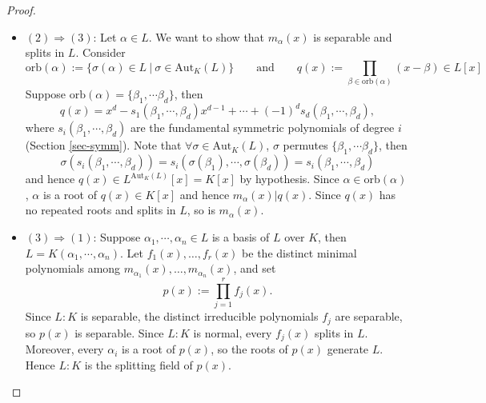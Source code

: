 \begin{proof}
\begin{itemize}
        \item $(2)\Rightarrow (3)$: Let $\alpha \in L $. We want to show that $m_{\alpha}(x) $ is separable and splits in $L$. Consider 
        $$\mathrm{orb}(\alpha):=\{\sigma(\alpha) \in L\ |\ \sigma \in \mathrm{Aut}_K(L)\}  \quad \quad \mathrm{  and  } \quad \quad q(x):= \prod_{\beta \in \mathrm{orb}(\alpha)} (x-\beta) \in L[x]$$
        Suppose $\mathrm{orb}(\alpha)=\{\beta_1,\cdots \beta_d\}$, then 
        $$q(x)=x^d-s_1(\beta_1,\cdots,\beta_d)x^{d-1}+\cdots+(-1)^ds_d(\beta_1 ,\cdots, \beta_d),$$ 
        where $s_i(\beta_1,\cdots,\beta_d)$ are the fundamental symmetric polynomials of degree $i$ (Section \ref{sec-symm}). Note that $\forall \sigma \in \mathrm{Aut}_K(L)$, $\sigma$ permutes $\{\beta_1,\cdots \beta_d\}$, then $$\sigma(s_i(\beta_1,\cdots,\beta_d)) = s_i(\sigma(\beta_1),\cdots,\sigma(\beta_d)) = s_i(\beta_1,\cdots,\beta_d)$$and hence $q(x) \in L^{\mathrm{Aut}_K(L)}[x]=K[x]$ by hypothesis. Since $\alpha \in \mathrm{orb}(\alpha)$, $\alpha$ is a root of $q(x) \in K[x]$ and hence $m_{\alpha}(x) | q(x)$. 
        Since $q(x)$ has no repeated roots and splits in $L$, so is $m_{\alpha}(x)$.
        
        \item $(3)\Rightarrow (1)$: Suppose $\alpha_1,\cdots,\alpha_n \in L$ is a basis of $L$ over $K$, then $L=K(\alpha_1,\cdots,\alpha_n)$. Let $f_1(x),\dots,f_r(x)$ be the distinct minimal polynomials among $m_{\alpha_1}(x),\dots,m_{\alpha_n}(x)$, and set
        \[
        p(x):=\prod_{j=1}^r f_j(x).
        \]
        Since $L:K$ is separable, the distinct irreducible polynomials $f_j$ are separable, so $p(x)$ is separable. Since $L:K$ is normal, every $f_j(x)$ splits in $L$. Moreover, every $\alpha_i$ is a root of $p(x)$, so the roots of $p(x)$ generate $L$. Hence $L:K$ is the splitting field of $p(x)$.
    \end{itemize}
\end{proof}
